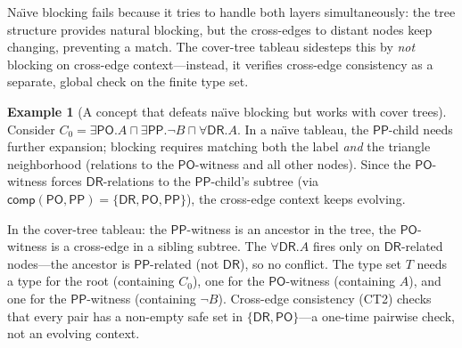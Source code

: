 \documentclass[
]{ceurart}
\theoremstyle{definition}
\newtheorem{examplex}[theorem]{Example}
\newcommand{\DR}{\ensuremath{\mathsf{DR}}}
\newcommand{\PO}{\ensuremath{\mathsf{PO}}}
\newcommand{\PP}{\ensuremath{\mathsf{PP}}}
\newcommand{\comp}{\ensuremath{\mathsf{comp}}}
\begin{document}
Na\"{\i}ve blocking fails because it tries to handle both layers
simultaneously: the tree structure provides natural blocking, but
the cross-edges to distant nodes keep changing, preventing a match.
The cover-tree tableau sidesteps this by \emph{not} blocking on
cross-edge context---instead, it verifies cross-edge consistency
as a separate, global check on the finite type set.

\begin{examplex}[A concept that defeats na\"{\i}ve blocking but
  works with cover trees]
\label{ex:cover-tree-win}
Consider $C_0 = \exists\PO.A \sqcap \exists\PP.\neg B \sqcap
\forall\DR.A$.
In a na\"{\i}ve tableau, the $\PP$-child needs further expansion;
blocking requires matching both the label \emph{and} the
triangle neighborhood (relations to the $\PO$-witness and all
other nodes).  Since the $\PO$-witness forces $\DR$-relations
to the $\PP$-child's subtree (via $\comp(\PO, \PP) = \{\DR,\PO,\PP\}$),
the cross-edge context keeps evolving.

In the cover-tree tableau: the $\PP$-witness is an ancestor in
the tree, the $\PO$-witness is a cross-edge in a sibling subtree.
The $\forall\DR.A$ fires only on $\DR$-related nodes---the
ancestor is $\PP$-related (not $\DR$), so no conflict.
The type set $T$ needs a type for the root (containing $C_0$),
one for the $\PO$-witness (containing $A$), and one for the
$\PP$-witness (containing $\neg B$).  Cross-edge consistency
(CT2) checks that every pair has a non-empty safe set in
$\{\DR,\PO\}$---a one-time pairwise check, not an evolving
context.
\end{examplex}
\end{document}
